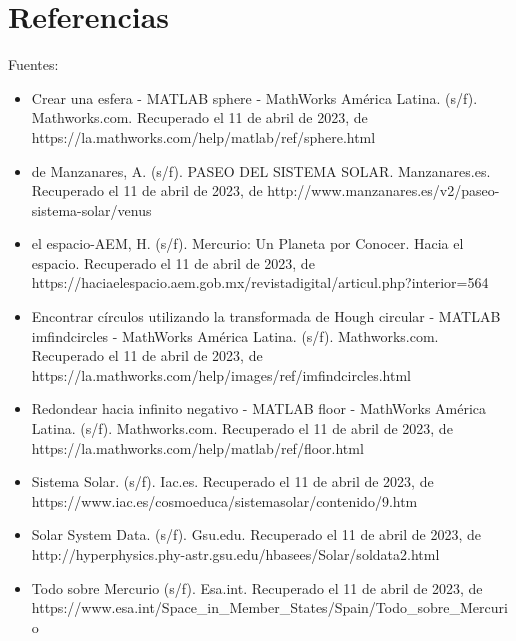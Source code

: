 \documentclass[12pt]{article}
\begin{document}
	
	\section{Referencias}
	
	Fuentes:
\begin{itemize}
		\item Crear una esfera - MATLAB sphere - MathWorks América Latina. (s/f). Mathworks.com. Recuperado el 11 de abril de 2023, de https://la.mathworks.com/help/matlab/ref/sphere.html
	\item de Manzanares, A. (s/f). PASEO DEL SISTEMA SOLAR. Manzanares.es. Recuperado el 11 de abril de 2023, de http://www.manzanares.es/v2/paseo-sistema-solar/venus
	\item el espacio-AEM, H. (s/f). Mercurio: Un Planeta por Conocer. Hacia el espacio. Recuperado el 11 de abril de 2023, de https://haciaelespacio.aem.gob.mx/revistadigital/articul.php?interior=564
	\item Encontrar círculos utilizando la transformada de Hough circular - MATLAB imfindcircles - MathWorks América Latina. (s/f). Mathworks.com. Recuperado el 11 de abril de 2023, de https://la.mathworks.com/help/images/ref/imfindcircles.html
	\item Redondear hacia infinito negativo - MATLAB floor - MathWorks América Latina. (s/f). Mathworks.com. Recuperado el 11 de abril de 2023, de https://la.mathworks.com/help/matlab/ref/floor.html
	\item Sistema Solar. (s/f). Iac.es. Recuperado el 11 de abril de 2023, de https://www.iac.es/cosmoeduca/sistemasolar/contenido/9.htm
	\item Solar System Data. (s/f). Gsu.edu. Recuperado el 11 de abril de 2023, de http://hyperphysics.phy-astr.gsu.edu/hbasees/Solar/soldata2.html
\item Todo sobre Mercurio (s/f). Esa.int. Recuperado el 11 de abril de 2023, de https://www.esa.int/Space_in_Member_States/Spain/Todo_sobre_Mercurio

\end{itemize}
		
\end{document}
